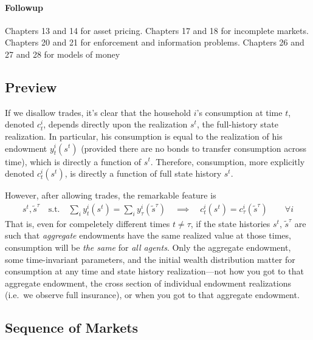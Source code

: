 \documentclass[12pt]{article}
\theoremstyle{plain}
\theoremstyle{definition}
\theoremstyle{remark}
\begin{document}
\paragraph{Followup}
Chapters 13 and 14 for asset pricing.
Chapters 17 and 18 for incomplete markets.
Chapters 20 and 21 for enforcement and information problems.
Chapters 26 and 27 and 28 for models of money



\subsection{Preview}

If we disallow trades, it's clear that the household $i$'s consumption
at time $t$, denoted $c_t^i$, depends directly upon the realization
$s^t$, the full-history state realization. In particular, his
consumption is equal to the realization of his endowment $y^i_t(s^t)$
(provided there are no bonds to transfer consumption across time), which
is directly a function of $s^t$.  Therefore, consumption, more
explicitly denoted $c_t^i(s^t)$, is directly a function of full state
history $s^t$.

However, after allowing trades, the remarkable feature is
\begin{align*}
  s^t, \tilde{s}^\tau
  \quad\text{s.t.}\quad
  \sum_i y_t^i(s^t)
  = \sum_i y_\tau^i(\tilde{s}^\tau)
  \quad\implies\quad
  c_t^i(s^t) = c_\tau^i(\tilde{s}^\tau)
  \qquad \forall i
\end{align*}
That is, even for compeletely different times $t\neq \tau$, if the state
histories $s^t$, $\tilde{s}^\tau$ are such that \emph{aggregate}
endowments have the same realized value at those times, consumption will
be \emph{the same} for \emph{all agents}.  Only the aggregate endowment,
some time-invariant parameters, and the initial wealth distribution
matter for consumption at any time and state history realization---not
how you got to that aggregate endowment, the cross section of individual
endowment realizations (i.e.\ we observe full insurance), or when you
got to that aggregate endowment.

\clearpage
\subsection{Sequence of Markets}
\end{document}
